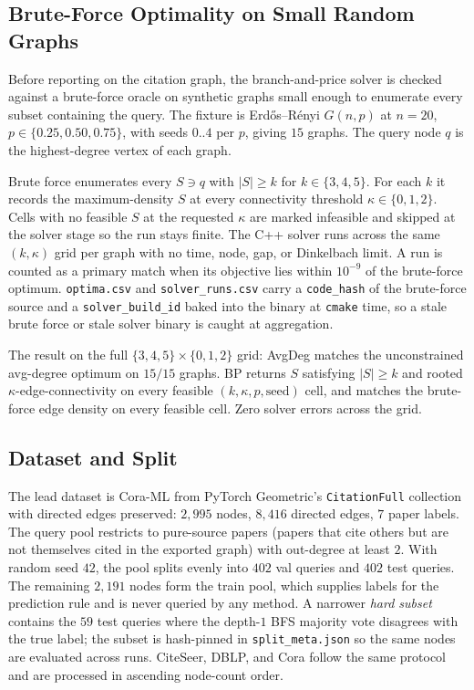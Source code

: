 \documentclass[11pt]{article}
\begin{document}
\subsection{Brute-Force Optimality on Small Random Graphs}
\label{sec:bf}

Before reporting on the citation graph, the branch-and-price solver is
checked against a brute-force oracle on synthetic graphs small enough to
enumerate every subset containing the query. The fixture is
Erd\H{o}s--R\'enyi $G(n, p)$ at $n = 20$, $p \in \{0.25, 0.50, 0.75\}$,
with seeds $0..4$ per $p$, giving $15$ graphs. The query node $q$ is the
highest-degree vertex of each graph.

Brute force enumerates every $S \ni q$ with $|S| \ge k$ for
$k \in \{3, 4, 5\}$. For each $k$ it records the maximum-density $S$ at
every connectivity threshold $\kappa \in \{0, 1, 2\}$. Cells with no
feasible $S$ at the requested $\kappa$ are marked infeasible and skipped
at the solver stage so the run stays finite. The C++ solver runs across
the same $(k, \kappa)$ grid per graph with no time, node, gap, or
Dinkelbach limit. A run is counted as a primary match when its objective
lies within $10^{-9}$ of the brute-force optimum. \texttt{optima.csv} and
\texttt{solver\_runs.csv} carry a \texttt{code\_hash} of the brute-force
source and a \texttt{solver\_build\_id} baked into the binary at
\texttt{cmake} time, so a stale brute force or stale solver binary is
caught at aggregation.

The result on the full $\{3, 4, 5\} \times \{0, 1, 2\}$ grid: AvgDeg
matches the unconstrained avg-degree optimum on $15/15$ graphs. BP
returns $S$ satisfying $|S| \ge k$ and rooted $\kappa$-edge-connectivity
on every feasible $(k, \kappa, p, \text{seed})$ cell, and matches the
brute-force edge density on every feasible cell. Zero solver errors
across the grid.

\subsection{Dataset and Split}
\label{sec:dataset}

The lead dataset is Cora-ML from PyTorch Geometric's \texttt{CitationFull}
collection with directed edges preserved: $2{,}995$ nodes, $8{,}416$
directed edges, $7$ paper labels. The query pool restricts to pure-source
papers (papers that cite others but are not themselves cited in the
exported graph) with out-degree at least $2$. With random seed $42$, the
pool splits evenly into $402$ val queries and $402$ test queries. The
remaining $2{,}191$ nodes form the train pool, which supplies labels for
the prediction rule and is never queried by any method. A narrower
\emph{hard subset} contains the $59$ test queries where the depth-$1$ BFS
majority vote disagrees with the true label; the subset is hash-pinned in
\texttt{split\_meta.json} so the same nodes are evaluated across runs.
CiteSeer, DBLP, and Cora follow the same protocol and are processed in
ascending node-count order.
\end{document}
